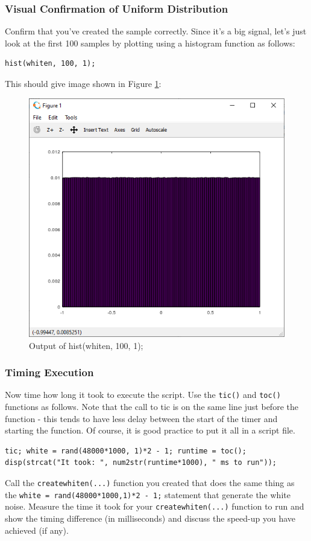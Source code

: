 \subsubsection{Visual Confirmation of Uniform Distribution}
Confirm that you've created the sample correctly. Since it’s a big signal, let’s just look at the first 100 samples by plotting using a histogram function as follows:
\begin{lstlisting}
hist(whiten, 100, 1);
\end{lstlisting}
This should give image shown in Figure \ref{fig:octave_hist}:

\begin{figure}[H]
\centering
\includegraphics[width=0.6\columnwidth]{Figures/octave_hist}
\caption{Output of hist(whiten, 100, 1);}
\label{fig:octave_hist}
\end{figure}

\subsubsection{Timing Execution}
Now time how long it took to execute the script. Use the \verb|tic()| and \verb|toc()| functions as follows. Note that the call to tic is on the same line just before the function - this tends to have less delay between the start of the timer and starting the function. Of course, it is good practice to put it all in a script file.
\begin{lstlisting}
tic; white = rand(48000*1000, 1)*2 - 1; runtime = toc();
disp(strcat("It took: ", num2str(runtime*1000), " ms to run"));
\end{lstlisting}

Call the \verb|createwhiten(...)| function you created that does the same thing as the \verb|white = rand(48000*1000,1)*2 - 1;| statement that generate the white noise. Measure the time it took for your \verb|createwhiten(...)| function to run and show the timing difference (in milliseconds) and discuss the speed-up you have achieved (if any).

